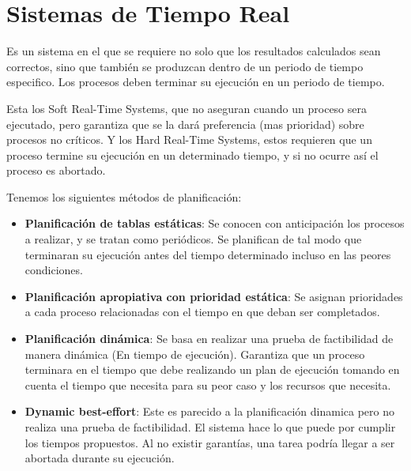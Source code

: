 \documentclass{article}
\begin{document}
\newpage


\section*{Sistemas de Tiempo Real}
Es un sistema en el que se requiere no solo que los resultados calculados sean correctos,
sino que también se produzcan dentro de un periodo de tiempo especifico. Los procesos
deben terminar su ejecución en un periodo de tiempo. 

Esta los Soft Real-Time Systems, que no aseguran cuando un proceso sera ejecutado, pero garantiza que se la dará
preferencia (mas prioridad) sobre procesos no críticos.
Y los Hard Real-Time Systems, estos requieren que un proceso
termine su ejecución en un determinado tiempo, y si no
ocurre así el proceso es abortado.

Tenemos los siguientes métodos de planificación:

\begin{itemize}
	\item \textbf{Planificación de tablas estáticas}: Se conocen con anticipación los procesos a realizar, y se
	tratan como periódicos. Se planifican de tal modo que terminaran su ejecución antes del tiempo determinado
	incluso en las peores condiciones.
	
	\item \textbf{Planificación apropiativa con prioridad estática}: Se asignan prioridades a cada proceso relacionadas
	con el tiempo en que deban ser completados.
	
	\item \textbf{Planificación dinámica}: Se basa en realizar una prueba de factibilidad de manera dinámica (En tiempo de ejecución).
	Garantiza que un proceso terminara en el tiempo que debe realizando un plan de ejecución tomando en cuenta
	el tiempo que necesita para su peor caso y los recursos que necesita.
	
	\item \textbf{Dynamic best-effort}: Este es parecido a la planificación dinamica pero no realiza una prueba de factibilidad.
	El sistema hace lo que puede por cumplir los tiempos propuestos. Al no existir garantías, una tarea podría
	llegar a ser abortada durante su ejecución.
	
\end{itemize}
\newpage
\end{document}
